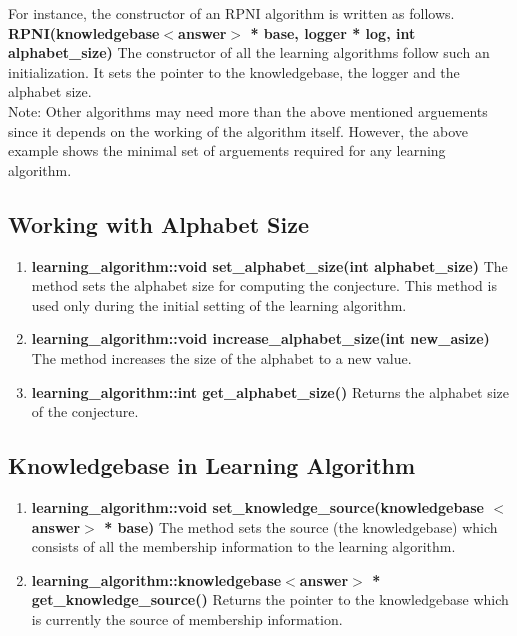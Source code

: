 For instance, the constructor of an RPNI algorithm is written as follows. \vskip 1pt
\textbf{RPNI(knowledgebase$<$answer$>$ * base, logger * log, int alphabet\_size)} \vskip 1pt
The constructor of all the learning algorithms follow such an initialization. It sets the pointer to the knowledgebase, the logger and the alphabet size. \\
Note: Other algorithms may need more than the above mentioned arguements since it depends on the working of the algorithm itself. However, the above example shows the minimal set of arguements required for any learning algorithm. 

\subsection*{Working with Alphabet Size}

\begin{enumerate}
 \item \textbf{learning\_algorithm::void set\_alphabet\_size(int alphabet\_size)} \vskip 1pt
	The method sets the alphabet size for computing the conjecture. This method is used only during the initial setting of the learning algorithm. 

 \item \textbf{learning\_algorithm::void increase\_alphabet\_size(int new\_asize)} \vskip 1pt
	The method increases the size of the alphabet to a new value.

 \item \textbf{learning\_algorithm::int get\_alphabet\_size()} \vskip 1pt
	Returns the alphabet size of the conjecture.
\end{enumerate}

\subsection*{Knowledgebase in Learning Algorithm}

\begin{enumerate}

 \item \textbf{learning\_algorithm::void set\_knowledge\_source(knowledgebase $<$answer$>$ * base)} \vskip 1pt
	The method sets the source (the knowledgebase) which consists of all the membership information to the learning algorithm.

 \item \textbf{learning\_algorithm::knowledgebase$<$answer$>$ * get\_knowledge\_source()} \vskip 1pt
	Returns the pointer to the knowledgebase which is currently the source of membership information.

\end{enumerate}

